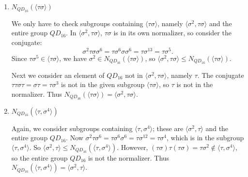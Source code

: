 \documentclass{article}
\begin{document}
\begin{enumerate}[label=(\alph*), itemsep=0em]
    \item $N_{QD_{16}}(\langle \tau \sigma \rangle)$
    
        We only have to check subgroups containing $\langle \tau \sigma \rangle$, namely $\langle \sigma^2, \tau \sigma \rangle$ and the entire group $QD_{16}$. In $\langle \sigma^2, \tau \sigma \rangle$, $\tau \sigma$ is in its own normalizer, so consider the conjugate:
        \begin{equation*}
            \sigma^2 \tau \sigma \sigma^6 = \tau \sigma^6 \sigma \sigma^6 = \tau \sigma^{13} = \tau \sigma^5.
        \end{equation*}
        Since $\tau \sigma^5 \in \langle \tau \sigma \rangle$, we have $\sigma^2 \in N_{QD_{16}}(\langle \tau \sigma \rangle)$, so $\langle \sigma^2, \tau \sigma \rangle \leq N_{QD_{16}}(\langle \tau \sigma \rangle)$.

        Next we consider an element of $QD_{16}$ not in $\langle \sigma^2, \tau \sigma \rangle$, namely $\tau$. The conjugate $\tau \tau \sigma \tau = \sigma \tau = \tau \sigma^3$ is not in the given subgroup $\langle \tau \sigma \rangle$, so $\tau$ is not in the normalizer. Thus $N_{QD_{16}}(\langle \tau \sigma \rangle) = \langle \sigma^2, \tau \sigma \rangle$.
    \item $N_{QD_{16}}(\langle \tau, \sigma^4 \rangle)$
        
        Again, we consider subgroups containing $\langle \tau, \sigma^4 \rangle$; these are $\langle \sigma^2, \tau \rangle$ and the entire group $QD_{16}$. Now $\sigma^2 \tau \sigma^6 = \tau \sigma^6 \sigma^6 = \tau \sigma^{12} = \tau \sigma^4$, which is in the subgroup $\langle \tau, \sigma^4 \rangle$. So $\langle \sigma^2, \tau \rangle \leq N_{QD_{16}}(\langle \tau, \sigma^4 \rangle)$. However, $(\tau \sigma)\tau(\tau \sigma) = \tau \sigma^2 \notin \langle \tau, \sigma^4 \rangle$, so the entire group $QD_{16}$ is not the normalizer. Thus $N_{QD_{16}}(\langle \tau, \sigma^4 \rangle) = \langle \sigma^2, \tau \rangle$.
\end{enumerate}
\end{document}
